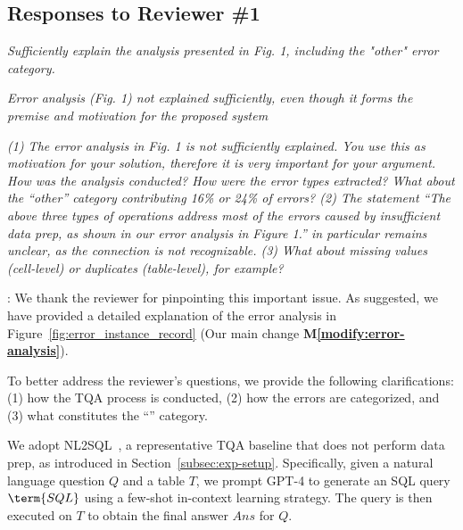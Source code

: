 \subsection*{Responses to Reviewer \#1}
\label{cover_letter:r1}


\begin{shaded}
{
 \emph{Sufficiently explain the analysis presented in Fig. 1, including the "other" error category.}

 \emph{Error analysis (Fig. 1) not explained sufficiently, even though it forms the premise and motivation for the proposed system}

\emph{(1) The error analysis in Fig. 1 is not sufficiently explained. You use this as motivation for your solution, therefore it is very important for your argument. How was the analysis conducted? How were the error types extracted? What about the ``other'' category contributing 16\% or 24\% of errors? (2) The statement ``The above three types of operations address most of the errors caused by insufficient data prep, as shown in our error analysis in Figure 1.'' in particular remains unclear, as the connection is not recognizable. (3) What about missing values (cell-level) or duplicates (table-level), for example?}

}
\end{shaded}

: 
We thank the reviewer for pinpointing this important issue. 
As suggested, we have provided a detailed explanation of the error analysis in Figure~\ref{fig:error_instance_record} (Our main change \textbf{M\ref{modify:error-analysis}}).

To better address the reviewer’s questions, we provide the following clarifications: (1) how the TQA process is conducted, (2) how the errors are categorized, and (3) what constitutes the “” category.

We adopt NL2SQL~\cite{rajkumar2022evaluating}, a representative TQA baseline that does not perform data prep, as introduced in Section~\ref{subsec:exp-setup}. Specifically, given a natural language question $Q$ and a table $T$, we prompt GPT-4 to generate an SQL query $\term{SQL}$ using a few-shot in-context learning strategy. The query is then executed on $T$ to obtain the final answer $Ans$ for $Q$.

